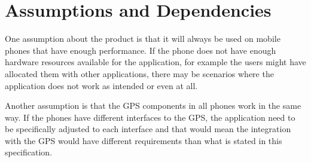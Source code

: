 \documentclass{scrreprt}
\begin{document}

\section{Assumptions and Dependencies}


One assumption about the product is that it will always be used on mobile phones that have enough performance. If the phone does not have enough hardware resources available for the application, for
example the users might have allocated them with other applications, there may be scenarios where the application does not work as intended or even at all.

Another assumption is that the GPS components in all phones work in the same way. If the phones have different interfaces to the GPS, the application need to be specifically adjusted to each interface and that would mean the integration with the GPS would have different requirements than what is stated in this specification.



\end{document}

